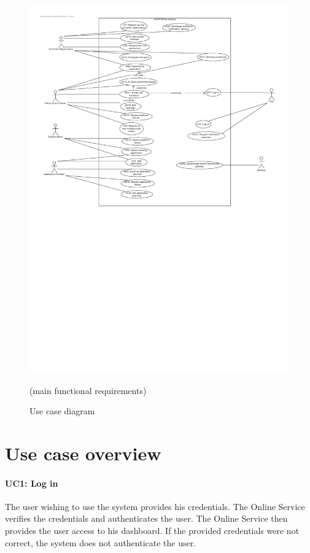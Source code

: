 \documentclass[english]{sareport}
\begin{document}
\begin{figure}[H]
    \centering
    \includegraphics[width=\textwidth]{Use_Case_Diagram.pdf}
    \caption{Use case diagram} (main functional requirements) \label{fig:Use_Case_Diagram}
\end{figure}

\section{Use case overview}\label{sec:uc_overview}
\paragraph{UC1: Log in}
The user wishing to use the system provides his credentials.
The Online Service verifies the credentials and authenticates the user.
The Online Service then provides the user access to his dashboard.
If the provided credentials were not correct, the system does not authenticate the user.
\end{document}
